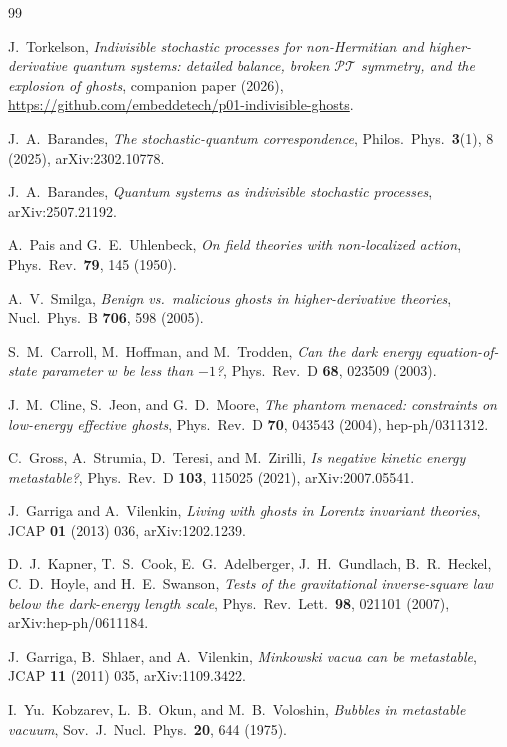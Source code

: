 \documentclass[11pt]{article}
\theoremstyle{definition}
\theoremstyle{remark}
\newcommand{\PT}{\mathcal{PT}}
\begin{document}
\begin{thebibliography}{99}

J.~Torkelson,
\emph{Indivisible stochastic processes for non-Hermitian and
higher-derivative quantum systems: detailed balance, broken $\PT$
symmetry, and the explosion of ghosts},
companion paper (2026),
\url{https://github.com/embeddetech/p01-indivisible-ghosts}.

J.~A.~Barandes,
\emph{The stochastic-quantum correspondence},
Philos.\ Phys.\ \textbf{3}(1), 8 (2025), arXiv:2302.10778.

J.~A.~Barandes,
\emph{Quantum systems as indivisible stochastic processes},
arXiv:2507.21192.

A.~Pais and G.~E.~Uhlenbeck,
\emph{On field theories with non-localized action},
Phys.\ Rev.\ \textbf{79}, 145 (1950).

A.~V.~Smilga,
\emph{Benign vs.\ malicious ghosts in higher-derivative theories},
Nucl.\ Phys.\ B \textbf{706}, 598 (2005).

S.~M.~Carroll, M.~Hoffman, and M.~Trodden,
\emph{Can the dark energy equation-of-state parameter $w$ be less
than $-1$?},
Phys.\ Rev.\ D \textbf{68}, 023509 (2003).

J.~M.~Cline, S.~Jeon, and G.~D.~Moore,
\emph{The phantom menaced: constraints on low-energy effective
ghosts},
Phys.\ Rev.\ D \textbf{70}, 043543 (2004), hep-ph/0311312.

C.~Gross, A.~Strumia, D.~Teresi, and M.~Zirilli,
\emph{Is negative kinetic energy metastable?},
Phys.\ Rev.\ D \textbf{103}, 115025 (2021), arXiv:2007.05541.

J.~Garriga and A.~Vilenkin,
\emph{Living with ghosts in Lorentz invariant theories},
JCAP \textbf{01} (2013) 036, arXiv:1202.1239.

D.~J.~Kapner, T.~S.~Cook, E.~G.~Adelberger, J.~H.~Gundlach,
B.~R.~Heckel, C.~D.~Hoyle, and H.~E.~Swanson,
\emph{Tests of the gravitational inverse-square law below the
dark-energy length scale},
Phys.\ Rev.\ Lett.\ \textbf{98}, 021101 (2007), arXiv:hep-ph/0611184.

J.~Garriga, B.~Shlaer, and A.~Vilenkin,
\emph{Minkowski vacua can be metastable},
JCAP \textbf{11} (2011) 035, arXiv:1109.3422.

I.~Yu.~Kobzarev, L.~B.~Okun, and M.~B.~Voloshin,
\emph{Bubbles in metastable vacuum},
Sov.\ J.\ Nucl.\ Phys.\ \textbf{20}, 644 (1975).


\end{thebibliography}
\end{document}
